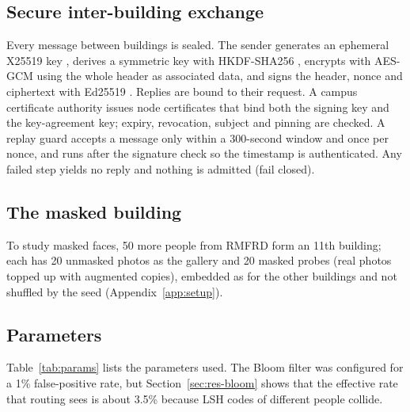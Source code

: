 \documentclass[12pt,a4paper,oneside]{report}
\begin{document}
\subsection{Secure inter-building exchange}
Every message between buildings is sealed. The sender generates an ephemeral X25519 key \cite{ref23}, derives a symmetric key with HKDF-SHA256 \cite{ref22}, encrypts with AES-GCM \cite{ref25} using the whole header as associated data, and signs the header, nonce and ciphertext with Ed25519 \cite{ref24}. Replies are bound to their request. A campus certificate authority issues node certificates that bind both the signing key and the key-agreement key; expiry, revocation, subject and pinning are checked. A replay guard accepts a message only within a 300-second window and once per nonce, and runs after the signature check so the timestamp is authenticated. Any failed step yields no reply and nothing is admitted (fail closed).



\subsection{The masked building}
To study masked faces, 50 more people from RMFRD \cite{ref20} form an 11th building; each has 20 unmasked photos as the gallery and 20 masked probes (real photos topped up with augmented copies), embedded as for the other buildings and not shuffled by the seed (Appendix~\ref{app:setup}).

\subsection{Parameters}
Table~\ref{tab:params} lists the parameters used. The Bloom filter was configured for a 1\% false-positive rate, but Section~\ref{sec:res-bloom} shows that the effective rate that routing sees is about 3.5\% because LSH codes of different people collide.
\end{document}
